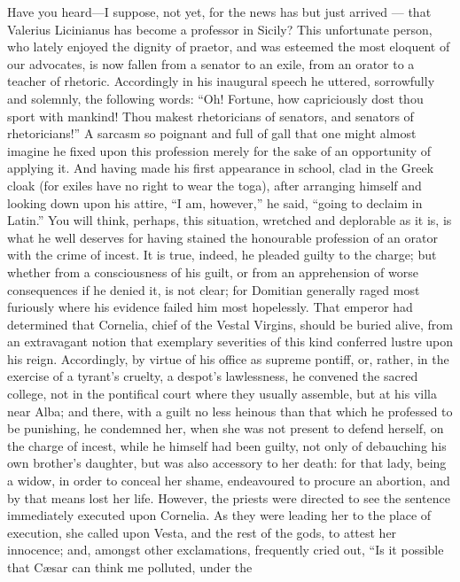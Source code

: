 Have you heard—I suppose, not yet, for the news has but just arrived
— that Valerius Licinianus has become a professor in Sicily? This
unfortunate person, who lately enjoyed the dignity of praetor, and was
esteemed the most eloquent of our advocates, is now fallen from a senator
to an exile, from an orator to a teacher of rhetoric. Accordingly in his
inaugural speech he uttered, sorrowfully and solemnly, the following
words: ``Oh! Fortune, how capriciously dost thou sport with mankind! Thou
makest rhetoricians of senators, and senators of rhetoricians!'' A sarcasm
so poignant and full of gall that one might almost imagine he fixed upon
this profession merely for the sake of an opportunity of applying it. And
having made his first appearance in school, clad in the Greek cloak (for
exiles have no right to wear the toga), after arranging himself and
looking down upon his attire, ``I am, however,'' he said, ``going to declaim
in Latin.'' You will think, perhaps, this situation, wretched and
deplorable as it is, is what he well deserves for having stained the
honourable profession of an orator with the crime of incest. It is true,
indeed, he pleaded guilty to the charge; but whether from a consciousness
of his guilt, or from an apprehension of worse consequences if he denied
it, is not clear; for Domitian generally raged most furiously where his
evidence failed him most hopelessly. That emperor had determined that
Cornelia, chief of the Vestal Virgins, should be buried alive, from an
extravagant notion that exemplary severities of this kind conferred lustre
upon his reign. Accordingly, by virtue of his office as supreme pontiff,
or, rather, in the exercise of a tyrant's cruelty, a despot's lawlessness,
he convened the sacred college, not in the pontifical court where they
usually assemble, but at his villa near Alba; and there, with a guilt no
less heinous than that which he professed to be punishing, he condemned
her, when she was not present to defend herself, on the charge of incest,
while he himself had been guilty, not only of debauching his own brother's
daughter, but was also accessory to her death: for that lady, being a
widow, in order to conceal her shame, endeavoured to procure an abortion,
and by that means lost her life. However, the priests were directed to see
the sentence immediately executed upon Cornelia. As they were leading her
to the place of execution, she called upon Vesta, and the rest of the
gods, to attest her innocence; and, amongst other exclamations, frequently
cried out, ``Is it possible that Cæsar can think me polluted, under the
